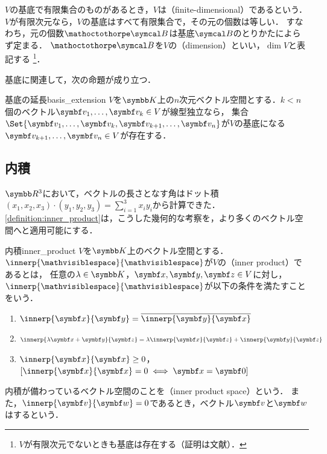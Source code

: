 \documentclass[../../main]{subfiles}
\begin{document}
\(V\)の基底で有限集合のものがあるとき，\(V\)は（finite-dimensional）であるという．
\(V\)が有限次元なら，\(V\)の基底はすべて有限集合で，その元の個数は等しい．
すなわち，元の個数\(\sizeof{\basis{B}}\)は基底\(\basis{B}\)のとりかたによらず定まる．
\(\sizeof{\basis{B}}\)を\(V\)の（dimension）といい，\(\dim V\)と表記する
\footnote{\(V\)が有限次元でないときも基底は存在する（証明は文献\cite{yukie2019}）．}．

基底に関連して，次の命題が成り立つ．

\begin{proposition}{基底の延長}{basis_extension}
  \(V\)を\(\numset{K}\)上の\(n\)次元ベクトル空間とする．\(k<n\)個のベクトル\(\vect{v}_1,\dots,\vect{v}_k\in V\)が線型独立なら，
  集合\(\Set{\vect{v}_1,\dots,\vect{v}_k,\vect{v}_{k+1},\dots,\vect{v}_n}\)が\(V\)の基底になる\(\vect{v}_{k+1},\dots,\vect{v}_n\in V\)が存在する．
\end{proposition}

\subsection{内積}
\(\numset{R}^3\)において，ベクトルの長さとなす角はドット積\((x_1,x_2,x_3)\cdot(y_1,y_2,y_3)=\sum_{i=1}^3x_iy_i\)から計算できた．
\cref{definition:inner_product}は，こうした幾何的な考察を，より多くのベクトル空間へと適用可能にする．

\begin{definition}{内積}{inner_product}\index{\(\innerp{\holder}{\holder}\)}
  \(V\)を\(\numset{K}\)上のベクトル空間とする．\(\innerp{\holder}{\holder}\)が\(V\)の（inner product）であるとは，
  任意の\(\lambda\in\numset{K}\)，\(\vect{x},\vect{y},\vect{z}\in V\)に対し，\(\innerp{\holder}{\holder}\)が以下の条件を満たすことをいう．
  \begin{enumerate}
    \item \(\innerp{\vect{x}}{\vect{y}}=\conj{\innerp{\vect{y}}{\vect{x}}}\)
    \item \(\innerp{\lambda\vect{x}+\vect{y}}{\vect{z}}=\lambda\innerp{\vect{x}}{\vect{z}}+\innerp{\vect{y}}{\vect{z}}\)
    \item \(\innerp{\vect{x}}{\vect{x}}\geq 0\)，\([\innerp{\vect{x}}{\vect{x}}=0\iff\vect{x}=\zvec]\)
  \end{enumerate}
\end{definition}

内積が備わっているベクトル空間のことを（inner product space）という．
また，\(\innerp{\vect{v}}{\vect{w}}=0\)であるとき，ベクトル\(\vect{v}\)と\(\vect{w}\)はするという．
\end{document}

